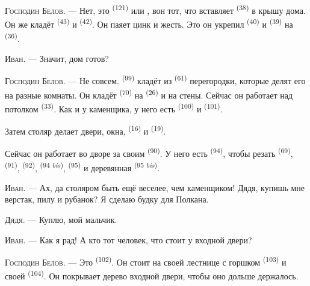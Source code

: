 \textsc{Господин Белов}. --- Нет, это  \textsuperscript{(121)}
или , вон тот, что вставляет 
\textsuperscript{(38)} в крышу дома. Он же кладёт 
\textsuperscript{(43)} и  \textsuperscript{(42)}. Он паяет
цинк и жесть. Это он укрепил  \textsuperscript{(40)} и
 \textsuperscript{(39)} на  \textsuperscript{(36)}.

\textsc{Иван}. --- Значит, дом готов?

\VUsaut{3.0mm}
\VUsaut{3.0mm}

\textsc{Господин Белов}. --- Не совсем.  \textsuperscript{(99)}
кладёт из  \textsuperscript{(61)} перегородки, которые делят его
на разные комнаты. Он кладёт  \textsuperscript{(70)} на
 \textsuperscript{(26)} и на стены. Сейчас он работает над потолком
 \textsuperscript{(33)}. Как и у каменщика, у него есть
 \textsuperscript{(100)} и  \textsuperscript{(101)}.

Затем столяр делает двери, окна,  \textsuperscript{(16)}
и  \textsuperscript{(19)}.

Сейчас он работает во дворе за своим  \textsuperscript{(90)}.
У него есть  \textsuperscript{(94)}, чтобы резать 
\textsuperscript{(69)},  \textsuperscript{(91)}, 
\textsuperscript{(92)},  \textsuperscript{(94 \textit{bis})},
 \textsuperscript{(95)} и деревянная 
\textsuperscript{(95 \textit{bis})}.

\textsc{Иван}. --- Ах, да столяром быть ещё веселее, чем каменщиком!
Дядя, купишь мне верстак, пилу и рубанок? Я сделаю будку для Полкана.

\textsc{Дядя}. --- Куплю, мой мальчик.

\textsc{Иван}. --- Как я рад! А кто тот человек, что стоит у входной
двери?

\VUsaut{3.0mm}
\VUsaut{3.0mm}

\textsc{Господин Белов}. --- Это  \textsuperscript{(102)}. Он стоит
на своей лестнице с горшком  \textsuperscript{(103)} и своей
 \textsuperscript{(104)}. Он покрывает дерево входной двери,
чтобы оно дольше держалось.

